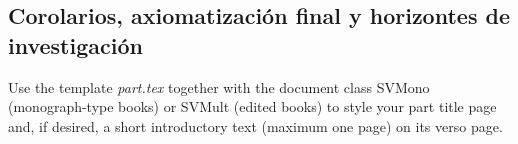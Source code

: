 % 
%
%

\begin{partbacktext}
\part{Corolarios, axiomatización final y horizontes de investigación}
\noindent Use the template \emph{part.tex} together with the document class SVMono (monograph-type books) or SVMult (edited books) to style your part title page and, if desired, a short introductory text (maximum one page) on its verso page.

\end{partbacktext}